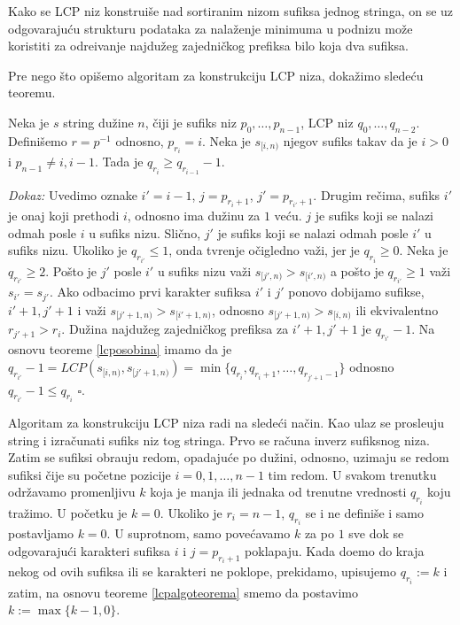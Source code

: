 Kako se LCP niz konstrui\v se nad sortiranim nizom sufiksa jednog stringa, on se uz odgovaraju\' cu strukturu podataka za nala\v zenje minimuma u podnizu mo\v ze koristiti za odre\dj ivanje najdu\v zeg zajedni\v ckog prefiksa bilo koja dva sufiksa.

Pre nego \v sto opi\v semo algoritam za konstrukciju LCP niza, doka\v zimo slede\' cu teoremu.

\begin{thm}
\label{lcpalgoteorema}
Neka je $s$ string du\v zine $n$, \v ciji je sufiks niz $p_0, \ldots, p_{n-1}$, LCP niz $q_0, \ldots, q_{n-2}$. Defini\v semo $r = p^{-1}$ odnosno, $p_{r_i} = i$. Neka je $s_{[i, n)}$ njegov sufiks takav da je $i>0$ i $p_{n-1} \not = i, i-1$. Tada je $q_{r_i} \geq q_{r_{i-1}} - 1$.
\end{thm}

\textit{Dokaz:} Uvedimo oznake $i' = i-1$, $j = p_{r_i + 1}$, $j' = p_{r_{i'} + 1}$. Drugim re\v cima, sufiks $i'$ je onaj koji prethodi $i$, odnosno ima du\v zinu za $1$ ve\' cu. $j$ je sufiks koji se nalazi odmah posle $i$ u sufiks nizu. Sli\v cno, $j'$ je sufiks koji se nalazi odmah posle $i'$ u sufiks nizu.  Ukoliko je $q_{r_{i'}} \leq 1$, onda tvr\dj enje o\v cigledno va\v zi, jer je $q_{r_i} \geq 0$. Neka je $q_{r_{i'}} \geq 2$. Po\v sto je $j'$ posle $i'$ u sufiks nizu va\v zi $s_{[j', n)} > s_{[i', n)}$ a po\v sto je $q_{r_{i'}} \geq 1$ va\v zi $s_{i'} = s_{j'}$. Ako odbacimo prvi karakter sufiksa $i'$ i $j'$ ponovo dobijamo sufikse, $i'+1, j'+1$ i va\v zi $s_{[j'+1, n)} > s_{[i'+1, n)}$, odnosno $s_{[j'+1, n)} > s_{[i, n)}$ ili ekvivalentno $r_{j'+1} > r_i$. Du\v zina najdu\v zeg zajedni\v ckog prefiksa za $i'+1, j'+1$ je $q_{r_{i'}} - 1$. Na osnovu teoreme \ref{lcposobina} imamo da je $q_{r_{i'}} - 1 = LCP(s_{[i, n)}, s_{[j'+1, n)}) = \min\{ q_{r_i}, q_{r_i+1}, \ldots, q_{r_{j'+1}-1} \}$ odnosno $q_{r_{i'}} - 1 \leq q_{r_i}$ \hfill $\square$.

Algoritam za konstrukciju LCP niza\cite{lcpnizrad} radi na slede\' ci na\v cin. Kao ulaz se prosle\dj uju string i izra\v cunati sufiks niz tog stringa. Prvo se ra\v cuna inverz sufiksnog niza. Zatim se sufiksi obra\dj uju redom, opadaju\' ce po du\v zini, odnosno, uzimaju se redom sufiksi \v cije su po\v cetne pozicije $i = 0, 1, \ldots, n-1$ tim redom. U svakom trenutku odr\v zavamo promenljivu $k$ koja je manja ili jednaka od trenutne vrednosti $q_{r_i}$ koju tra\v zimo. U po\v cetku je $k=0$. Ukoliko je $r_i = n-1$, $q_{r_i}$ se i ne defini\v se i samo postavljamo $k=0$. U suprotnom, samo pove\' cavamo $k$ za po $1$ sve dok se odgovaraju\' ci karakteri sufiksa $i$ i $j = p_{r_i + 1}$ poklapaju. Kada do\dj emo do kraja nekog od ovih sufiksa ili se karakteri ne poklope, prekidamo, upisujemo $q_{r_i} := k$ i zatim, na osnovu teoreme \ref{lcpalgoteorema} smemo da postavimo $k := \max\{k-1, 0\}$.

